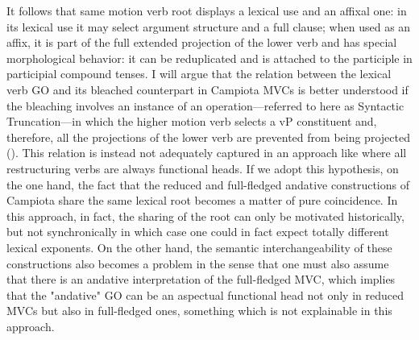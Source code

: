 \documentclass[output=paper]{langscibook}
\begin{document}
It follows that same motion verb root displays a lexical use and an affixal one:  in its lexical use it may select argument structure and a full clause; when used as an affix, it is part of the full extended projection of the lower verb and has special morphological behavior: it can be reduplicated and is attached to the participle in participial compound tenses.  I will argue that the relation between the lexical verb GO and its bleached counterpart in Campiota MVCs is better understood if the bleaching involves an instance of an operation—referred to here as Syntactic Truncation—in which the higher motion verb selects a vP constituent and, therefore, all the projections of the lower verb are prevented from being projected (\cite{wurmbrand2014a, wurmbrand2015, wurmbrand2017verb}). This relation is instead not adequately captured in an approach like \cite{cinque2001a, cinque2006a} where all restructuring verbs are always functional heads. If we adopt this hypothesis, on the one hand, the fact that the reduced and full-fledged andative constructions of  Campiota share the same lexical root becomes a matter of pure coincidence. In this approach, in fact, the sharing of the root can only be motivated historically, but not synchronically in which case one could in fact expect totally different lexical exponents. On the other hand, the semantic interchangeability of these constructions also becomes a problem in the sense that one must also assume that there is an andative interpretation of the full-fledged MVC, which implies that the "andative" GO can be an aspectual functional head not only in reduced MVCs but also in full-fledged ones, something which is not explainable in this approach.
\end{document}

